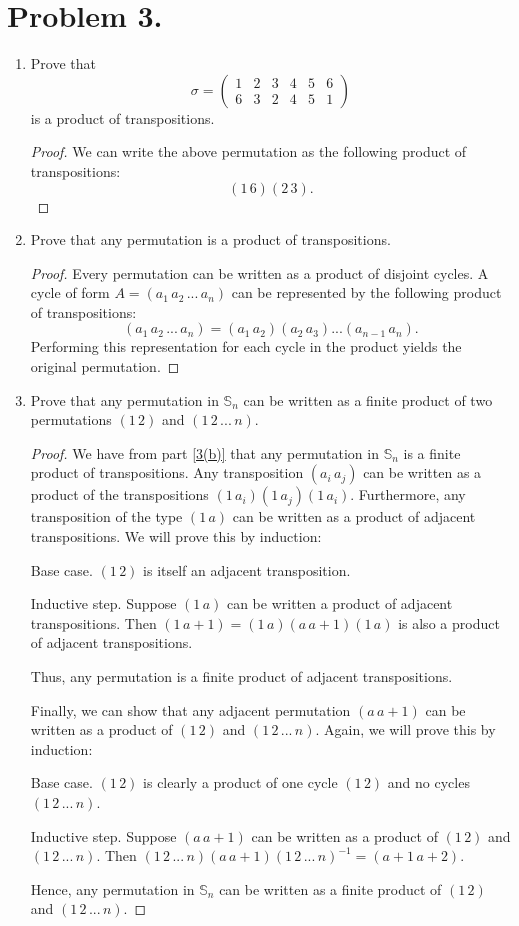 \documentclass{article}
\begin{document}
\section{Problem 3.}
\begin{enumerate}[label=(\alph*)]
    \item Prove that 
    \[\sigma = \begin{pmatrix}
    1 & 2 & 3 & 4 & 5 & 6\\
    6 & 3 & 2 & 4 & 5 & 1\end{pmatrix}\]
    is a product of transpositions.
    \begin{proof}
    We can write the above permutation as the following product of transpositions:
    \[(1\,6)(2\,3).\]
    \end{proof}
    \item Prove that any permutation is a product of transpositions.
    \label{3(b)}
    \begin{proof}
    Every permutation can be written as a product of disjoint cycles. A cycle of form $A=(a_1\,a_2\,...\,a_n)$ can be represented by the following product of transpositions:
    \[(a_1\,a_2\,...\,a_n)=(a_1\,a_2)(a_2\,a_3)...(a_{n-1}\,a_n).\]
    Performing this representation for each cycle in the product yields the original permutation.
    \end{proof}
    \item Prove that any permutation in $\mathbb{S}_n$ can be written as a finite product of two permutations $(1\,2)$ and $(1\,2\,...\,n)$.
    \begin{proof}
    We have from part \ref{3(b)} that any permutation in $\mathbb{S}_n$ is a finite product of transpositions. Any transposition $(a_i\,a_j)$ can be written as a product of the transpositions $(1\,a_i)(1\,a_j)(1\,a_i)$. Furthermore, any transposition of the type $(1\,a)$ can be written as a product of adjacent transpositions. We will prove this by induction:
    \par Base case. $(1\,2)$ is itself an adjacent transposition.
    \par Inductive step. Suppose $(1\,a)$ can be written a product of adjacent transpositions. Then $(1\,a+1)=(1\,a)(a\,a+1)(1\,a)$ is also a product of adjacent transpositions.
    \par Thus, any permutation is a finite product of adjacent transpositions.
    \par Finally, we can show that any adjacent permutation $(a\,a+1)$ can be written as a product of $(1\,2)$ and $(1\,2\,...\,n)$. Again, we will prove this by induction:
    \par Base case. $(1\,2)$ is clearly a product of one cycle $(1\,2)$ and no cycles $(1\,2\,...\,n)$.
    \par Inductive step. Suppose $(a\,a+1)$ can be written as a product of $(1\,2)$ and $(1\,2\,...\,n)$. Then $(1\,2\,...\,n)(a\,a+1)(1\,2\,...\,n)^{-1}=(a+1\,a+2)$.
    \par Hence, any permutation in $\mathbb{S}_n$ can be written as a finite product of $(1\,2)$ and $(1\,2\,...\,n)$.
    \end{proof}
\end{enumerate}
\end{document}
